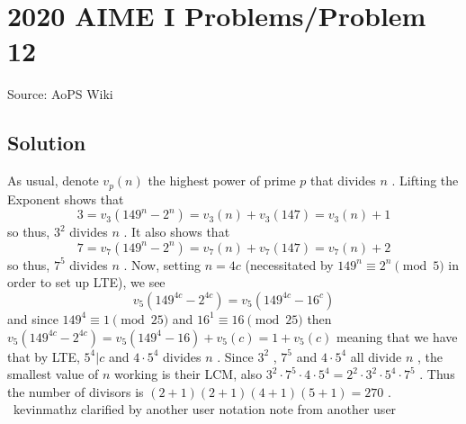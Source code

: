 \documentclass[12pt]{article}
\begin{document}
\section*{{2020 AIME I Problems/Problem 12}}
Source: AoPS Wiki

\subsection*{Solution}
As usual, denote $v_p(n)$ the highest power of prime $p$ that divides $n$ . Lifting the Exponent shows that \[3=v_3(149^n-2^n) = v_3(n) + v_3(147) = v_3(n)+1\] so thus, $3^2$ divides $n$ . It also shows that \[7=v_7(149^n-2^n) = v_7(n) + v_7(147) = v_7(n)+2\] so thus, $7^5$ divides $n$ . Now, setting $n = 4c$ (necessitated by $149^n \equiv 2^n \pmod 5$ in order to set up LTE), we see \[v_5(149^{4c}-2^{4c}) = v_5(149^{4c}-16^{c})\] and since $149^{4} \equiv 1 \pmod{25}$ and $16^1 \equiv 16 \pmod{25}$ then $v_5(149^{4c}-2^{4c})=v_5(149^4-16)+v_5(c)=1+v_5(c)$ meaning that we have that by LTE, $5^4 | c$ and $4 \cdot 5^4$ divides $n$ . Since $3^2$ , $7^5$ and $4\cdot 5^4$ all divide $n$ , the smallest value of $n$ working is their LCM, also $3^2 \cdot 7^5 \cdot 4 \cdot 5^4 = 2^2 \cdot 3^2 \cdot 5^4 \cdot 7^5$ . Thus the number of divisors is $(2+1)(2+1)(4+1)(5+1) = \boxed{270}$ . ~kevinmathz clarified by another user notation note from another user
\end{document}
